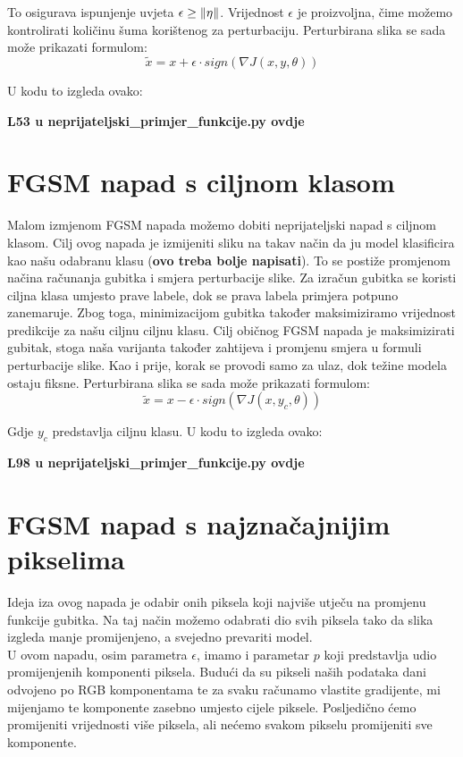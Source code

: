 To osigurava ispunjenje uvjeta $\epsilon \geq \left\|{\eta}\right\|$. Vrijednost $\epsilon$ je proizvoljna, čime možemo kontrolirati količinu šuma korištenog za perturbaciju. Perturbirana slika se sada može prikazati formulom: 
\[\widetilde{x} = x + \epsilon\cdot sign\left(\nabla J(x, y, \theta)\right)\]

U kodu to izgleda ovako:

\textbf{L53 u neprijateljski\_primjer\_funkcije.py ovdje}

\section{FGSM napad s ciljnom klasom}

Malom izmjenom FGSM napada možemo dobiti neprijateljski napad s ciljnom klasom. Cilj ovog napada je izmijeniti sliku na takav način da ju model klasificira kao našu odabranu klasu (\textbf{ovo treba bolje napisati}). To se postiže promjenom načina računanja gubitka i smjera perturbacije slike. Za izračun gubitka se koristi ciljna klasa umjesto prave labele, dok se prava labela primjera potpuno zanemaruje.  Zbog toga, minimizacijom gubitka također maksimiziramo vrijednost predikcije za našu ciljnu ciljnu klasu. Cilj običnog FGSM napada je maksimizirati gubitak, stoga naša varijanta također zahtijeva i promjenu smjera u formuli perturbacije slike. Kao i prije, korak se provodi samo za ulaz, dok težine modela ostaju fiksne. Perturbirana slika se sada može prikazati formulom: 
\[\widetilde{x} = x - \epsilon\cdot sign\left(\nabla J(x, y_c, \theta)\right)\]

Gdje $y_c$ predstavlja ciljnu klasu. U kodu to izgleda ovako:

\textbf{L98 u neprijateljski\_primjer\_funkcije.py ovdje}

\section{FGSM napad s najznačajnijim pikselima}

Ideja iza ovog napada je odabir onih piksela koji najviše utječu na promjenu funkcije gubitka. Na taj način možemo odabrati dio svih piksela tako da slika izgleda manje promijenjeno, a svejedno prevariti model. \\
U ovom napadu, osim parametra $\epsilon$, imamo i parametar $p$ koji predstavlja udio promijenjenih komponenti piksela. Budući da su pikseli naših podataka dani odvojeno po RGB komponentama te za svaku računamo vlastite gradijente, mi mijenjamo te komponente zasebno umjesto cijele piksele. Posljedično ćemo promijeniti vrijednosti više piksela, ali nećemo svakom pikselu promijeniti sve komponente. \\

